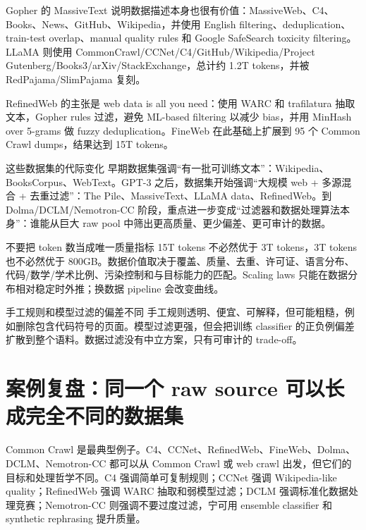 \documentclass[a4paper]{article}
\begin{document}
Gopher 的 MassiveText 说明数据描述本身也很有价值：MassiveWeb、C4、Books、News、GitHub、Wikipedia，并使用 English filtering、deduplication、train-test overlap、manual quality rules 和 Google SafeSearch toxicity filtering。LLaMA 则使用 CommonCrawl/CCNet/C4/GitHub/Wikipedia/Project Gutenberg/Books3/arXiv/StackExchange，总计约 1.2T tokens，并被 RedPajama/SlimPajama 复刻。

RefinedWeb 的主张是 web data is all you need：使用 WARC 和 trafilatura 抽取文本，Gopher rules 过滤，避免 ML-based filtering 以减少 bias，并用 MinHash over 5-grams 做 fuzzy deduplication。FineWeb 在此基础上扩展到 95 个 Common Crawl dumps，结果达到 15T tokens。

\begin{knowledgebox}{这些数据集的代际变化}
早期数据集强调“有一批可训练文本”：Wikipedia、BooksCorpus、WebText。GPT-3 之后，数据集开始强调“大规模 web + 多源混合 + 去重过滤”：The Pile、MassiveText、LLaMA data、RefinedWeb。到 Dolma/DCLM/Nemotron-CC 阶段，重点进一步变成“过滤器和数据处理算法本身”：谁能从巨大 raw pool 中筛出更高质量、更少偏差、更可审计的数据。
\end{knowledgebox}

\begin{warningbox}{不要把 token 数当成唯一质量指标}
15T tokens 不必然优于 3T tokens，3T tokens 也不必然优于 800GB。数据价值取决于覆盖、质量、去重、许可证、语言分布、代码/数学/学术比例、污染控制和与目标能力的匹配。Scaling laws 只能在数据分布相对稳定时外推；换数据 pipeline 会改变曲线。
\end{warningbox}

\begin{warningbox}{手工规则和模型过滤的偏差不同}
手工规则透明、便宜、可解释，但可能粗糙，例如删除包含代码符号的页面。模型过滤更强，但会把训练 classifier 的正负例偏差扩散到整个语料。数据过滤没有中立方案，只有可审计的 trade-off。
\end{warningbox}

\section{案例复盘：同一个 raw source 可以长成完全不同的数据集}

Common Crawl 是最典型例子。C4、CCNet、RefinedWeb、FineWeb、Dolma、DCLM、Nemotron-CC 都可以从 Common Crawl 或 web crawl 出发，但它们的目标和处理哲学不同。C4 强调简单可复制规则；CCNet 强调 Wikipedia-like quality；RefinedWeb 强调 WARC 抽取和弱模型过滤；DCLM 强调标准化数据处理竞赛；Nemotron-CC 则强调不要过度过滤，宁可用 ensemble classifier 和 synthetic rephrasing 提升质量。
\end{document}
